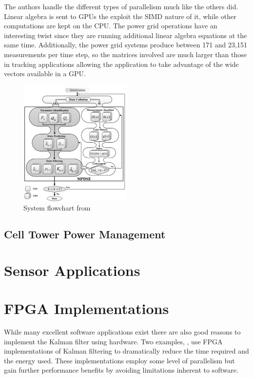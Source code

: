 \documentclass[11pt]{article}
\begin{document}
The authors handle the different types of parallelism much like the others did. Linear algebra is sent to GPUs the exploit the SIMD nature of it, while other computations are kept on the CPU. The power grid operations have an interesting twist since they are running additional linear algebra equations at the same time. Additionally, the power grid systems produce between 171 and 23,151 measurements per time step, so the matrices involved are much larger than those in tracking applications allowing the application to take advantage of the wide vectors available in a GPU.


\begin{figure}
\centering
\includegraphics[width=0.5\textwidth]{mpdse.png}
\caption{System flowchart from \cite{karimipour2015extended}}
\label{fig:mpdse}
\end{figure}

\subsection{Cell Tower Power Management}
\cite{rosen2013parallelization}

\section{Sensor Applications}
\cite{rao1991fully,spanos2005distributed,spanos2005approximate,hashemipour1988decentralized}

\section{FPGA Implementations}
While many excellent software applications exist there are also good reasons to implement the Kalman filter using hardware. Two examples,  \cite{bonato2009floating,liu2007efficient}, use FPGA implementations of Kalman filtering to dramatically reduce the time required and the energy used. These implementations employ some level of parallelism but gain further performance benefits by avoiding limitations inherent to software.
\end{document}
